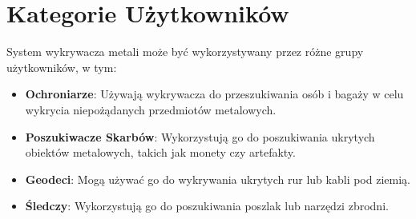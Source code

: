 \documentclass{article}
\begin{document}
\section{Kategorie Użytkowników}
System wykrywacza metali może być wykorzystywany przez różne grupy użytkowników, w tym:
\begin{itemize}
    \item \textbf{Ochroniarze}: Używają wykrywacza do przeszukiwania osób i bagaży w celu wykrycia niepożądanych przedmiotów metalowych.
    \item \textbf{Poszukiwacze Skarbów}: Wykorzystują go do poszukiwania ukrytych obiektów metalowych, takich jak monety czy artefakty.
    \item \textbf{Geodeci}: Mogą używać go do wykrywania ukrytych rur lub kabli pod ziemią.
    \item\textbf{Śledczy}: Wykorzystują go do poszukiwania poszlak lub narzędzi zbrodni.
\end{itemize}
\end{document}
